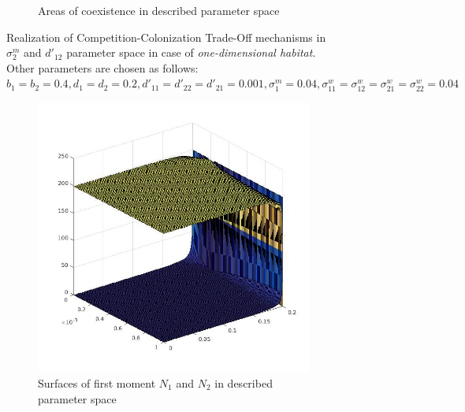 \begin{figure}
\begin{subfigure}{.5\textwidth}
		\caption{Areas of coexistence in described parameter space} 
		\label{fig:cctod1:sub4}
	\end{subfigure}
	\caption{Realization of Competition-Colonization Trade-Off mechanisms in $\sigma^m_2$ and $d'_{12}$ parameter space in case of \emph{one-dimensional habitat}. Other parameters are chosen as follows:  $b_{1}=b_{2}=0.4
		, d_{1}=d_{2}=0.2
		, d'_{11}=d'_{22}=d'_{21}=0.001,
		\sigma_{1}^{m}=0.04
		, \sigma_{11}^{w}=\sigma_{12}^{w}=\sigma_{21}^{w}=\sigma_{22}^{w}=0.04$}
	\label{fig:cctod1}
\end{figure}

\begin{figure}
	\centering
	\begin{subfigure}{.5\textwidth}
		\centering
		\includegraphics[width=.95\linewidth]{N1N2cctoD2.jpg}
		\caption{Surfaces of first moment \(N_1\) and \(N_2\) in described parameter space}
		\label{fig:cctod2:sub1}
	\end{subfigure}%
	\begin{subfigure}{.5\textwidth}
		\centering

\end{subfigure}
\end{figure}
